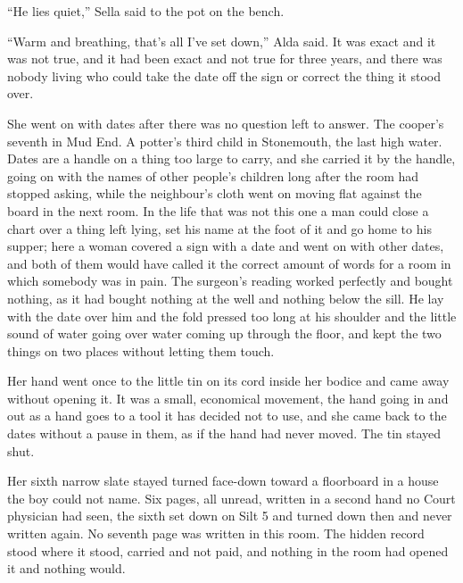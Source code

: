 “He lies quiet,” Sella said to the pot on the bench.

“Warm and breathing, that's all I've set down,” Alda said. It was exact and it was not true, and it had been exact and not true for three years, and there was nobody living who could take the date off the sign or correct the thing it stood over.

She went on with dates after there was no question left to answer. The cooper's seventh in Mud End. A potter's third child in Stonemouth, the last high water. Dates are a handle on a thing too large to carry, and she carried it by the handle, going on with the names of other people's children long after the room had stopped asking, while the neighbour's cloth went on moving flat against the board in the next room. In the life that was not this one a man could close a chart over a thing left lying, set his name at the foot of it and go home to his supper; here a woman covered a sign with a date and went on with other dates, and both of them would have called it the correct amount of words for a room in which somebody was in pain. The surgeon's reading worked perfectly and bought nothing, as it had bought nothing at the well and nothing below the sill. He lay with the date over him and the fold pressed too long at his shoulder and the little sound of water going over water coming up through the floor, and kept the two things on two places without letting them touch.

\scenebreak

Her hand went once to the little tin on its cord inside her bodice and came away without opening it. It was a small, economical movement, the hand going in and out as a hand goes to a tool it has decided not to use, and she came back to the dates without a pause in them, as if the hand had never moved. The tin stayed shut.

Her sixth narrow slate stayed turned face-down toward a floorboard in a house the boy could not name. Six pages, all unread, written in a second hand no Court physician had seen, the sixth set down on Silt 5 and turned down then and never written again. No seventh page was written in this room. The hidden record stood where it stood, carried and not paid, and nothing in the room had opened it and nothing would.


